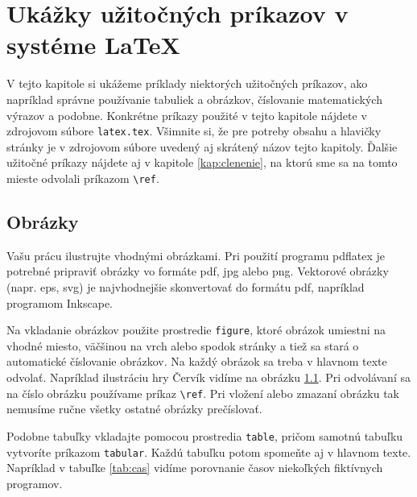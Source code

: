 \chapter[LaTeX]{Ukážky užitočných príkazov v systéme LaTeX}
\label{kap:latex}

V tejto kapitole si ukážeme príklady niektorých užitočných príkazov,
ako napríklad správne používanie tabuliek a obrázkov, číslovanie
matematických výrazov a podobne. Konkrétne príkazy použité v tejto
kapitole nájdete v zdrojovom súbore \verb'latex.tex'.  Všimnite si, že
pre potreby obsahu a hlavičky stránky je v zdrojovom súbore uvedený aj
skrátený názov tejto kapitoly. Ďalšie užitočné príkazy nájdete aj v
kapitole \ref{kap:clenenie}, na ktorú sme sa na tomto mieste odvolali
príkazom \verb'\ref'.

\section{Obrázky}

Vašu prácu ilustrujte vhodnými obrázkami. Pri použití programu
pdflatex je potrebné pripraviť obrázky vo formáte pdf, jpg alebo
png. Vektorové obrázky (napr. eps, svg) je najvhodnejšie skonvertovať
do formátu pdf, napríklad programom Inkscape.

Na vkladanie obrázkov použite prostredie \verb'figure', ktoré obrázok
umiestni na vhodné miesto, väčšinou na vrch alebo spodok stránky a
tiež sa stará o automatické číslovanie obrázkov. Na každý obrázok sa
treba v hlavnom texte odvolať. Napríklad ilustráciu hry Červík vidíme
na obrázku \ref{obr:cursus}. Pri odvolávaní sa na číslo obrázku
používame príkaz \verb'\ref'. Pri vložení alebo zmazaní obrázku tak
nemusíme ručne všetky ostatné obrázky prečíslovať.

\begin{figure}
\label{obr:cursus}
\end{figure}

Podobne tabuľky vkladajte pomocou prostredia \verb'table', pričom
samotnú tabuľku vytvoríte príkazom \verb'tabular'. Každú tabuľku potom
spomeňte aj v hlavnom texte. Napríklad v tabuľke \ref{tab:cas}
vidíme porovnanie časov niekoľkých fiktívnych programov.

